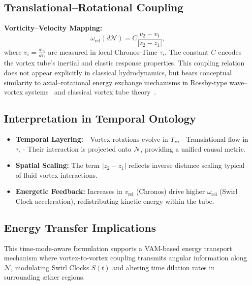 \documentclass[a4paper,12pt]{article}
\begin{document}
    \subsection*{Translational–Rotational Coupling}

    \textbf{Vorticity–Velocity Mapping:}
    \begin{equation*}
        \omega_\text{rel}(d\mathcal{N}) = C \frac{v_2 - v_1}{|z_2 - z_1|},
    \end{equation*}
    where \( v_i = \frac{dz_i}{d\tau_i} \) are measured in local Chronos-Time \( \tau_i \). The constant \( C \) encodes the vortex tube’s
inertial and elastic response properties. This coupling relation does not appear explicitly in classical hydrodynamics, but bears conceptual similarity to axial–rotational energy exchange mechanisms in Rossby-type wave–vortex systems~\cite{rossby1939} and classical vortex tube theory~\cite{lamb1932, batchelor2000}.


\subsection{Interpretation in Temporal Ontology}

    \begin{itemize}
        \item \textbf{Temporal Layering:}
        - Vortex rotations evolve in \( T_v \),
        - Translational flow in \( \tau \),
        - Their interaction is projected onto \( \mathcal{N} \), providing a unified causal metric.

        \item \textbf{Spatial Scaling:} The term \( |z_2 - z_1| \) reflects inverse distance scaling typical of fluid vortex interactions.

        \item \textbf{Energetic Feedback:} Increases in \( v_\text{rel} \) (Chronos) drive higher \( \omega_\text{rel} \) (Swirl Clock acceleration), redistributing kinetic energy within the tube.
    \end{itemize}

    \subsection*{Energy Transfer Implications}

    This time-mode-aware formulation supports a VAM-based energy transport mechanism where vortex-to-vortex coupling transmits angular information along \( \mathcal{N} \), modulating Swirl Clocks \( S(t) \) and altering time dilation rates in surrounding æther regions.
\end{document}

